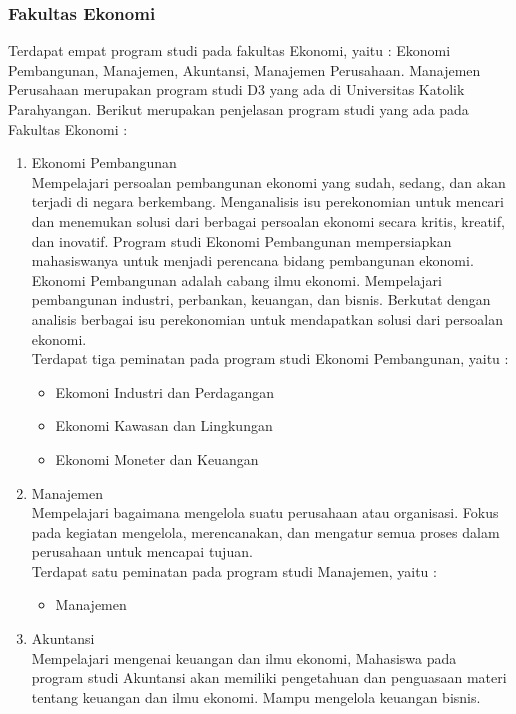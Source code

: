 \subsubsection{Fakultas Ekonomi}
Terdapat empat program studi pada fakultas Ekonomi, yaitu : Ekonomi Pembangunan, Manajemen, Akuntansi, Manajemen Perusahaan. Manajemen Perusahaan merupakan program studi D3 yang ada di Universitas Katolik Parahyangan. Berikut merupakan penjelasan program studi yang ada pada Fakultas Ekonomi :
	
	\begin{enumerate}
		\item Ekonomi Pembangunan\\
			 Mempelajari persoalan pembangunan ekonomi yang sudah, sedang, dan akan
terjadi di negara berkembang. Menganalisis isu perekonomian untuk mencari dan menemukan solusi dari berbagai persoalan ekonomi secara kritis, kreatif, dan inovatif. Program studi Ekonomi Pembangunan mempersiapkan mahasiswanya untuk menjadi perencana bidang pembangunan ekonomi. Ekonomi Pembangunan adalah cabang ilmu ekonomi. Mempelajari pembangunan industri, perbankan, keuangan, dan bisnis. Berkutat dengan analisis berbagai isu perekonomian untuk mendapatkan solusi dari persoalan ekonomi.\\

			Terdapat tiga peminatan pada program studi Ekonomi Pembangunan, yaitu :
			\begin{itemize}
				\item Ekomoni Industri dan Perdagangan
				\item Ekonomi Kawasan dan Lingkungan
				\item Ekonomi Moneter dan Keuangan
			\end{itemize}\leavevmode

		\item Manajemen\\
			Mempelajari bagaimana mengelola suatu perusahaan atau organisasi. Fokus pada kegiatan mengelola, merencanakan, dan mengatur semua proses dalam perusahaan untuk mencapai tujuan.\\
			
			Terdapat satu peminatan pada program studi Manajemen, yaitu :
			\begin{itemize}
				\item Manajemen
			\end{itemize}\leavevmode

		\item Akuntansi\\
			Mempelajari mengenai keuangan dan ilmu ekonomi, Mahasiswa pada program studi Akuntansi akan memiliki pengetahuan dan penguasaan materi tentang keuangan dan ilmu ekonomi. Mampu mengelola keuangan bisnis.\\
			

\end{enumerate}

